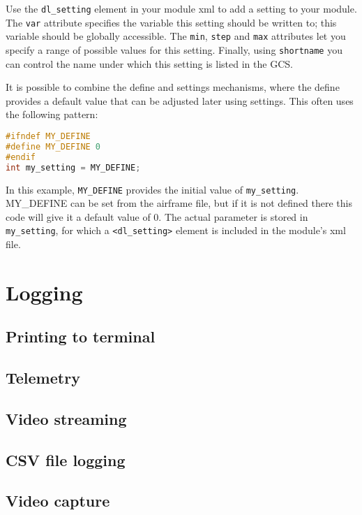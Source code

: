 \documentclass{article}
\begin{document}
Use the \texttt{dl\_setting} element in your module xml to add a setting to your module. The \texttt{var} attribute specifies the variable this setting should be written to; this variable should be globally accessible. The \texttt{min}, \texttt{step} and \texttt{max} attributes let you specify a range of possible values for this setting. Finally, using \texttt{shortname} you can control the name under which this setting is listed in the GCS.

It is possible to combine the define and settings mechanisms, where the define provides a default value that can be adjusted later using settings. This often uses the following pattern:
\begin{lstlisting}[language=c]
#ifndef MY_DEFINE
#define MY_DEFINE 0
#endif
int my_setting = MY_DEFINE;
\end{lstlisting}
In this example, \texttt{MY\_DEFINE} provides the initial value of \texttt{my\_setting}. MY\_DEFINE can be set from the airframe file, but if it is not defined there this code will give it a default value of 0. The actual parameter is stored in \texttt{my\_setting}, for which a \texttt{<dl\_setting>} element is included in the module's xml file.





\section{Logging}

\subsection{Printing to terminal}

\subsection{Telemetry}

\subsection{Video streaming}

\subsection{CSV file logging}

\subsection{Video capture}
\end{document}
